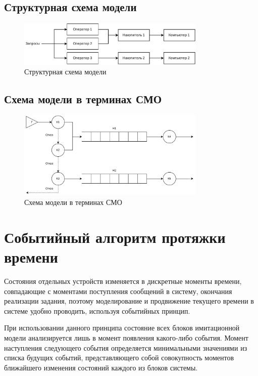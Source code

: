 \newpage

\subsection*{Структурная схема модели}

\begin{figure}[ht]
    \centering
    \includegraphics[width=0.8\textwidth]{assets/struct.pdf}
    \caption{Структурная схема модели}
    \label{fig:struct}
\end{figure}

\subsection*{Схема модели в терминах СМО}

\begin{figure}[ht]
    \centering
    \includegraphics[width=0.8\textwidth]{assets/smo.pdf}
    \caption{Схема модели в терминах СМО}
    \label{fig:smo}
\end{figure}

\section{Событийный алгоритм протяжки времени}

Состояния отдельных устройств изменяется в дискретные моменты времени, совпадающие с моментами поступления сообщений в систему, окончания реализации задания, поэтому моделирование и продвижение текущего времени в системе удобно проводить, используя событийных принцип.

При использовании данного принципа состояние всех блоков имитационной модели анализируется лишь в момент появления какого-либо события.
Момент наступления следующего события определяется минимальными значениями из списка будущих событий, представляющего собой совокупность моментов ближайшего изменения состояний каждого из блоков системы.

